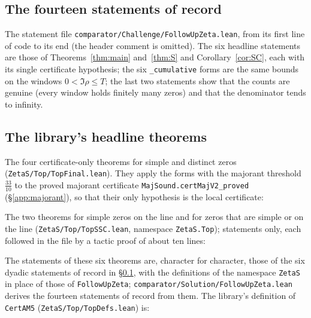 \subsection{The fourteen statements of record}\label{app:record}
The statement file \texttt{comparator/Challenge/FollowUpZeta.lean}, from its first line of code to its end (the header comment is omitted).
The six headline statements are those of Theorems~\ref{thm:main} and~\ref{thm:S} and Corollary~\ref{cor:SC}, each with its single
certificate hypothesis; the six \texttt{\_cumulative} forms are the same bounds on the windows $0<\Im\rho\le T$; the last two statements
show that the counts are genuine (every window holds finitely many zeros) and that the denominator tends to infinity.


\subsection{The library's headline theorems}\label{app:headline}
The four certificate-only theorems for simple and distinct zeros (\texttt{ZetaS/Top/TopFinal.lean}). They apply the forms with the majorant
threshold $\frac{33}{10}$ to the proved majorant certificate \texttt{MajSound.certMajV2\_proved} (\S\ref{app:majorant}), so that their only
hypothesis is the local certificate:


The two theorems for simple zeros on the line and for zeros that are simple or on the line (\texttt{ZetaS/Top/TopSSC.lean}, namespace \texttt{ZetaS.Top});
statements only, each followed in the file by a tactic proof of about ten lines:



The statements of these six theorems are, character for character, those of the six dyadic statements of record in \S\ref{app:record},
with the definitions of the namespace \texttt{ZetaS} in place of those of \texttt{FollowUpZeta}; \texttt{comparator/Solution/FollowUpZeta.lean}
derives the fourteen statements of record from them. The library's definition of \texttt{CertAM5} (\texttt{ZetaS/Top/TopDefs.lean}) is:

